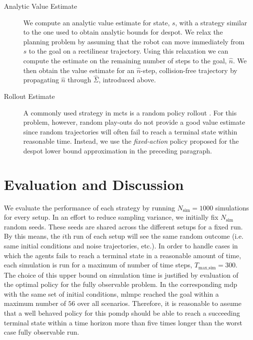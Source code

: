 \begin{description}
  \item[Analytic Value Estimate] We compute an analytic value estimate for
    state, $s$, with a strategy similar to the one used to obtain analytic
    bounds for \ac{despot}. We relax the planning problem by assuming that the
    robot can move immediately from $s$ to the goal on a rectilinear
    trajectory. Using this relaxation we can compute the estimate on the
    remaining number of steps to the goal, $\hat{n}$. We then obtain the value
    estimate for an $\hat{n}$-step, collision-free trajectory by propagating
    $\hat{n}$ through $\hat{\Sigma}$, introduced above.
  \item[Rollout Estimate] A commonly used strategy in \ac{mcts} is a random
    policy rollout \cite{browne2012survey}. For this problem, however, random
    play-outs do not provide a good value estimate since random trajectories
    will often fail to reach a terminal state within reasonable time. Instead,
    we use the \emph{fixed-action} policy proposed for the \ac{despot} lower
    bound approximation in the preceding paragraph.
\end{description}

\section{Evaluation and Discussion}\label{sec:lp-evaluation}

We evaluate the performance of each strategy by running $N_\text{sim} = 1000$
simulations for every setup. In an effort to reduce sampling variance, we
initially fix $N_\text{sim}$ random seeds. These seeds are shared across the
different setups for a fixed run. By this means, the $i$th run of each setup
will see the same random outcome (i.e. same initial conditions and noise
trajectories, etc.). In order to handle cases in which the agents fails to
reach a terminal state in a reasonable amount of time, each simulation is run
for a maximum of number of time steps, $T_\text{max,sim} = 300$. The choice of
this upper bound on simulation time is justified by evaluation of the optimal
policy for the fully observable problem. In the corresponding \ac{mdp} with the
same set of initial conditions, \ac{mlmpc} reached the goal within a maximum
number of $56$ over all scenarios. Therefore, it is reasonable to assume that
a well behaved policy for this \ac{pomdp} should be able to reach a succeeding
terminal state within a time horizon more than five times longer than the worst
case fully observable run.

